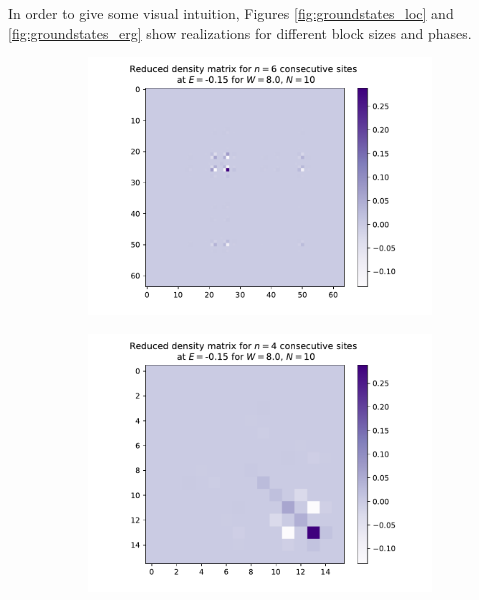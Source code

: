 \documentclass[reprint,amsmath,amssymb,aps,prb]{revtex4-2}
\begin{document}
In order to give some visual intuition, Figures \ref{fig:groundstates_loc} and \ref{fig:groundstates_erg} show realizations for different block sizes and phases.

\begin{center}
	\begin{figure}[h!]
		\centering	
		\begin{subfigure}[c]{0.45\textwidth}
			\includegraphics[width=\linewidth]{../results/groundstates/N10n6_trainingset_groundstate_Wmax8.0}
		\end{subfigure}
		\begin{subfigure}[c]{0.45\textwidth}
			\includegraphics[width=\linewidth]{../results/groundstates/N10n4_trainingset_groundstate_Wmax8.0}

\end{subfigure}
\end{figure}
\end{center}
\end{document}
